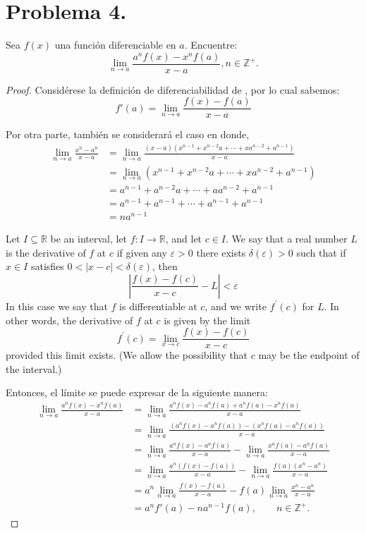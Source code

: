 \section{Problema 4.} Sea $f(x)$ una función diferenciable en $a$. Encuentre:
$$\lim _{n \rightarrow a} \frac{a^{n} f(x)-x^{n} f(a)}{x-a}, n \in \mathbb{Z}^{+}.$$

\begin{proof}
Considérese la definición de diferenciabilidad de \cite{bartle2000introduction}, por lo cual sabemos: 
$$f'(a)=\lim_{n\to a}\frac{f(x)-f(a)}{x-a}$$

Por otra parte, también se considerará el caso en donde, 
\begin{align*}
    \lim_{n\to a}\frac{x^n-a^n}{x-a} &= \lim_{n\to a}\frac{(x-a)(x^{n-1}+x^{n-2}a+\cdots + xa^{n-2}+a^{n-1})}{x-a} \\
    &= \lim_{n\to a}(x^{n-1}+x^{n-2}a+\cdots + xa^{n-2}+a^{n-1})\\
    &= a^{n-1}+a^{n-2}a+\cdots + aa^{n-2}+a^{n-1}\\
    &= a^{n-1}+a^{n-1}+\cdots + a^{n-1}+a^{n-1}\\
    &= na^{n-1}
\end{align*}
\begin{tcolorbox}[colback=blue!15,colframe=blue!1!blue,title=Definición 6.1.1. de \cite{bartle2000introduction}]
Let $I \subseteq \mathbb{R}$ be an interval, let $f: I \rightarrow \mathbb{R}$, and let $c \in I$. We say that a real number $L$ is the derivative of $f$ at $c$ if given any $\varepsilon>0$ there exists $\delta(\varepsilon)>0$ such that if $x \in I$ satisfies $0<|x-c|<\delta(\varepsilon)$, then
$$
\left|\frac{f(x)-f(c)}{x-c}-L\right|<\varepsilon
$$
In this case we say that $f$ is differentiable at $c$, and we write $f^{\prime}(c)$ for $L$. In other words, the derivative of $f$ at $c$ is given by the limit
$$
f^{\prime}(c)=\lim _{x \rightarrow c} \frac{f(x)-f(c)}{x-c}
$$
provided this limit exists. (We allow the possibility that $c$ may be the endpoint of the interval.)
\end{tcolorbox}




Entonces, el límite se puede expresar de la siguiente manera: 
\begin{align*}
    \lim _{n \rightarrow a} \frac{a^{n} f(x)-x^{n} f(a)}{x-a} &=\lim _{n \rightarrow a}\frac{a^n f(x)-a^nf(a)+a^nf(a)-x^nf(a)}{x-a} \\
   &=  \lim _{n \rightarrow a}\frac{(a^n f(x)-a^nf(a))-(x^nf(a)-a^nf(a))}{x-a}\\
   &= \lim _{n \rightarrow a}\frac{a^n f(x)-a^nf(a)}{x-a} -\lim _{n \rightarrow a}\frac{x^nf(a)-a^nf(a)}{x-a}\\
   &= \lim _{n \rightarrow a}\frac{a^n( f(x)-f(a))}{x-a} -\lim _{n \rightarrow a}\frac{f(a)(x^n-a^n)}{x-a}\\
  &= a^n\lim _{n \rightarrow a}\frac{ f(x)-f(a)}{x-a} -f(a)\lim _{n \rightarrow a}\frac{x^n-a^n}{x-a}\\
  &= a^nf'(a)-na^{n-1}f(a), \qquad n\in\mathbb{Z^+}.
\end{align*}
\end{proof}


